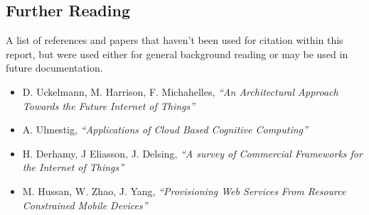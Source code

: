 \documentclass{article}
\begin{document}
\subsection{Further Reading}
A list of references and papers that haven't been used for citation within this report, but were used either for general background reading or may be used in future documentation.
\begin{itemize}
    \item D. Uckelmann, M. Harrison, F. Michahelles, \textit{``An Architectural Approach Towards the Future Internet of Things''}
    \item A. Ulmestig, \textit{``Applications of Cloud Based Cognitive Computing''}
    \item H. Derhamy, J Eliasson, J. Delsing, \textit{``A survey of Commercial Frameworks for the Internet of Things''}
    \item M. Hussan, W. Zhao, J. Yang, \textit{``Provisioning Web Services From Resource Constrained Mobile Devices''}
\end{itemize}
\end{document}
